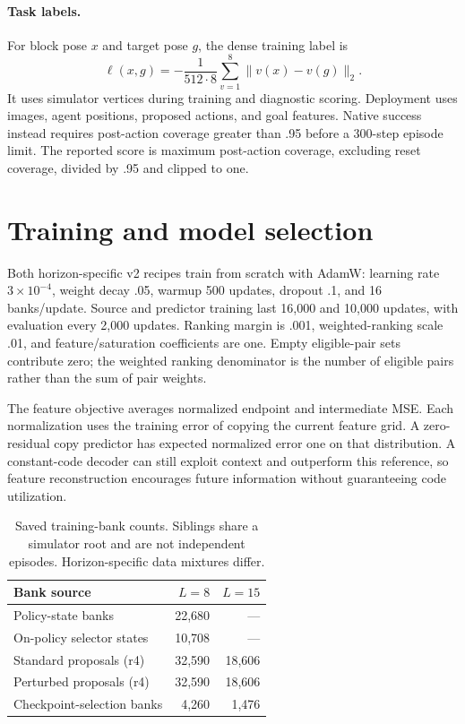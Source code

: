 \documentclass[10pt,twocolumn,letterpaper]{article}
\begin{document}
\paragraph{Task labels.}
For block pose $x$ and target pose $g$, the dense training label is
\begin{equation}
\ell(x,g)=-\frac{1}{512\cdot8}\sum_{v=1}^{8}\|v(x)-v(g)\|_2.
\end{equation}
It uses simulator vertices during training and diagnostic scoring. Deployment uses images, agent positions, proposed actions, and goal features. Native success instead requires post-action coverage greater than .95 before a 300-step episode limit. The reported score is maximum post-action coverage, excluding reset coverage, divided by .95 and clipped to one.

\section{Training and model selection}
Both horizon-specific v2 recipes train from scratch with AdamW: learning rate $3\times10^{-4}$, weight decay .05, warmup 500 updates, dropout .1, and 16 banks/update. Source and predictor training last 16,000 and 10,000 updates, with evaluation every 2,000 updates. Ranking margin is .001, weighted-ranking scale .01, and feature/saturation coefficients are one. Empty eligible-pair sets contribute zero; the weighted ranking denominator is the number of eligible pairs rather than the sum of pair weights.

The feature objective averages normalized endpoint and intermediate MSE. Each normalization uses the training error of copying the current feature grid. A zero-residual copy predictor has expected normalized error one on that distribution. A constant-code decoder can still exploit context and outperform this reference, so feature reconstruction encourages future information without guaranteeing code utilization.

\begin{table}[t]
\centering\small
\begin{tabular}{lrr}
\toprule
Bank source & $L=8$ & $L=15$ \\
\midrule
Policy-state banks & 22,680 & --- \\
On-policy selector states & 10,708 & --- \\
Standard proposals (r4) & 32,590 & 18,606 \\
Perturbed proposals (r4) & 32,590 & 18,606 \\
\midrule
Checkpoint-selection banks & 4,260 & 1,476 \\
\bottomrule
\end{tabular}
\caption{Saved training-bank counts. Siblings share a simulator root and are not independent episodes. Horizon-specific data mixtures differ.}
\end{table}
\end{document}
